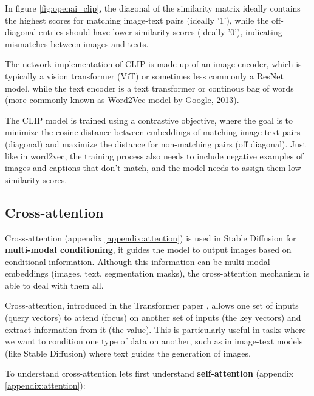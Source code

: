 In figure \ref{fig:openai_clip}, the diagonal of the similarity matrix ideally contains the highest scores for matching image-text pairs (ideally '1'), while the off-diagonal entries should have lower similarity scores (ideally '0'), indicating mismatches between images and texts.

The network implementation of CLIP is made up of an image encoder, which is typically a vision transformer (ViT) \cite{vision_transformer} or sometimes less commonly a ResNet \cite{resnet} model, while the text encoder is a text transformer \cite{transformer} or continous bag of words \cite{cbow_word2vec} (more commonly known as Word2Vec model by Google, 2013).

The CLIP model is trained using a contrastive objective, where the goal is to minimize the cosine distance between embeddings of matching image-text pairs (diagonal) and maximize the distance for non-matching pairs (off diagonal). Just like in word2vec, the training process also needs to include negative examples of images and captions that don't match, and the model needs to assign them low similarity scores.














\subsection{Cross-attention}
\label{subsec:cross_attention}

Cross-attention (appendix \ref{appendix:attention}) is used in Stable Diffusion for \textbf{multi-modal conditioning}, it guides the model to output images based on conditional information. Although this information can be multi-modal embeddings (images, text, segmentation masks), the cross-attention mechanism is able to deal with them all.

Cross-attention, introduced in the Transformer paper \cite{transformer}, allows one set of inputs (query vectors) to attend (focus) on another set of inputs (the key vectors) and extract information from it (the value). This is particularly useful in tasks where we want to condition one type of data on another, such as in image-text models (like Stable Diffusion) where text guides the generation of images.

To understand cross-attention lets first understand \textbf{self-attention} (appendix \ref{appendix:attention}):

